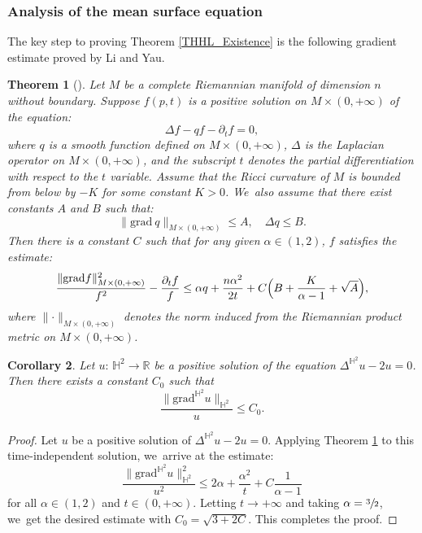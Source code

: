 \documentclass[11pt]{article}
\theoremstyle{plain}
\newtheorem{cor}{Corollary}[section]
\newtheorem{theorem}[cor]{Theorem}
\theoremstyle{definition}
\newcommand{\grad}{\mathrm{grad}^{\mathbb{H}^2}}
\begin{document}
\subsubsection{Analysis of the mean surface equation}
The key step to proving Theorem \ref{THHL_Existence} is the following gradient estimate proved by Li and Yau.

\begin{theorem}[{\cite[Th.\,1.3]{Li_Yau}}]\label{Li_Yau}
Let $M$ be a complete Riemannian manifold of dimension $n$ without boundary. Suppose $f(p, t)$ is a positive solution on $M \times (0, +\infty)$ of the equation:
\[
\Delta f-qf-\partial_tf=0,
\]
where $q$ is a smooth function defined on $M \times (0, +\infty)$, $\Delta$ is the Laplacian operator on $M \times (0, +\infty)$, and the subscript $t$ denotes the partial differentiation with respect to the $t$ variable. Assume that the Ricci curvature of $M$ is bounded from below by $-K$ for some constant $K > 0$. We~also assume that there exist constants $A$ and $B$ such that:
\[
\lVert \mathrm{grad}\ q\rVert_{M\times(0,+\infty)}\leq A,\quad \Delta q\leq B.
\]
Then there is a constant $C$ such that for any given $\alpha \in (1, 2)$, $f$ satisfies the estimate:
\[
\frac{\lVert \mathrm{grad} f\rVert_{M\times(0,+\infty)}^2}{f^2}-\frac{\partial_tf}{f}\leq \alpha q+\frac{n\alpha^2}{2t}+C\Bigl(B+\frac{K}{\alpha-1}+\sqrt{A}\Bigr),
\]
where $\lVert\cdot\rVert_{M \times (0, +\infty)}$ denotes the norm induced from the Riemannian product metric on $M \times (0, +\infty)$.
\end{theorem}
\begin{cor}\label{Li_Yau_Cor}
Let $u{:}\, \mathbb{H}^2 \!\to\! \mathbb{R}$ be a positive solution of the equation \hbox{$\Delta^{\mathbb{H}^2} u \!-\! 2u \!=\! 0$}. Then there exists a constant $C_0$ such that
\[
\frac{\lVert \grad u\rVert_{\mathbb{H}^2}}{u} \leq C_0.
\]
\end{cor}

\begin{proof}
Let $u$ be a positive solution of $\Delta^{\mathbb{H}^2} u - 2u = 0$. Applying Theorem \ref{Li_Yau} to this time-independent solution, we~arrive at the estimate:
\[
\frac{\lVert \grad u\rVert_{\mathbb{H}^2}^2}{u^2} \leq 2\alpha + \frac{\alpha^2}{t} + C\frac{1}{\alpha-1}
\]
for all $\alpha \in (1,2)$ and $t \in (0, +\infty)$. Letting $t \to +\infty$ and taking $\alpha = \sfrac{3}{2}$, we~get the desired estimate with $C_0 = \sqrt{3 + 2C}$. This completes the proof.
\end{proof}
\end{document}
